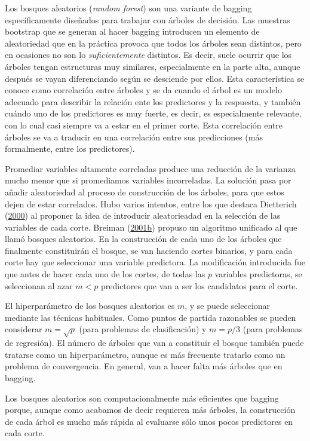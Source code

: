 \documentclass[
]{book}
\theoremstyle{break}
\theoremstyle{nonumberplain}
\begin{document}
Los bosques aleatorios (\emph{random forest}) son una variante de bagging específicamente diseñados para trabajar con árboles de decisión.
Las muestras bootstrap que se generan al hacer bagging introducen un elemento de aleatoriedad que en la práctica provoca que todos los árboles sean distintos, pero en ocasiones no son lo \emph{suficientemente} distintos.
Es decir, suele ocurrir que los árboles tengan estructuras muy similares, especialmente en la parte alta, aunque después se vayan diferenciando según se desciende por ellos.
Esta característica se conoce como correlación entre árboles y se da cuando el árbol es un modelo adecuado para describir la relación ente los predictores y la respuesta, y también cuándo uno de los predictores es muy fuerte, es decir, es especialmente relevante, con lo cual casi siempre va a estar en el primer corte.
Esta correlación entre árboles se va a traducir en una correlación entre sus predicciones (más formalmente, entre los predictores).

Promediar variables altamente correladas produce una reducción de la varianza mucho menor que si promediamos variables incorreladas.
La solución pasa por añadir aleatoriedad al proceso de construcción de los árboles, para que estos dejen de estar correlados.
Hubo varios intentos, entre los que destaca Dietterich (\protect\hyperlink{ref-dietterich2000experimental}{2000}) al proponer la idea de introducir aleatorieadad en la selección de las variables de cada corte.
Breiman (\protect\hyperlink{ref-breiman2001statistical}{2001b}) propuso un algoritmo unificado al que llamó bosques aleatorios.
En la construcción de cada uno de los árboles que finalmente constituirán el bosque, se van haciendo cortes binarios, y para cada corte hay que seleccionar una variable predictora.
La modificación introducida fue que antes de hacer cada uno de los cortes, de todas las \(p\) variables predictoras, se seleccionan al azar \(m < p\) predictores que van a ser los candidatos para el corte.

El hiperparámetro de los bosques aleatorios es \(m\), y se puede seleccionar mediante las técnicas habituales.
Como puntos de partida razonables se pueden considerar \(m = \sqrt{p}\) (para problemas de clasificación) y \(m = p/3\) (para problemas de regresión).
El número de árboles que van a constituir el bosque también puede tratarse como un hiperparámetro, aunque es más frecuente tratarlo como un problema de convergencia.
En general, van a hacer falta más árboles que en bagging.

Los bosques aleatorios son computacionalmente más eficientes que bagging porque, aunque como acabamos de decir requieren más árboles, la construcción de cada árbol es mucho más rápida al evaluarse sólo unos pocos predictores en cada corte.
\end{document}
